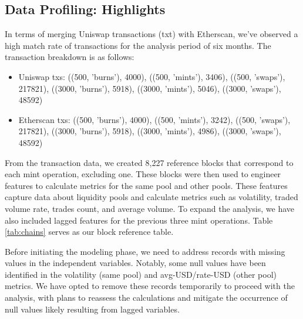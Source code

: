 \documentclass{article}
\begin{document}
{\subsection*{Data Profiling: Highlights}

In terms of merging Uniswap transactions (txt) with Etherscan, we've observed a high match rate of transactions for the analysis period of six months. The transaction breakdown is as follows:

\begin{itemize}[leftmargin=*,noitemsep,nolistsep]
\small
\item Uniswap txs: ((500, 'burns'), 4000), ((500, 'mints'), 3406), ((500, 'swaps'), 217821), ((3000, 'burns'), 5918), ((3000, 'mints'), 5046), ((3000, 'swaps'), 48592)
\item Etherscan txs: ((500, 'burns'), 4000), ((500, 'mints'), 3242), ((500, 'swaps'), 217821), ((3000, 'burns'), 5918), ((3000, 'mints'), 4986), ((3000, 'swaps'), 48592)
\end{itemize}

From the transaction data, we created 8,227 reference blocks that correspond to each mint operation, excluding one. These blocks were then used to engineer features to calculate metrics for the same pool and other pools. These features capture data about liquidity pools and calculate metrics such as volatility, traded volume rate, trades count, and average volume. To expand the analysis, we have also included lagged features for the previous three mint operations. Table \ref{tab:chains} serves as our block reference table.

Before initiating the modeling phase, we need to address records with missing values in the independent variables. Notably, some null values have been identified in the volatility (same pool) and avg-USD/rate-USD (other pool) metrics. We have opted to remove these records temporarily to proceed with the analysis, with plans to reassess the calculations and mitigate the occurrence of null values likely resulting from lagged variables.

}
\end{document}
